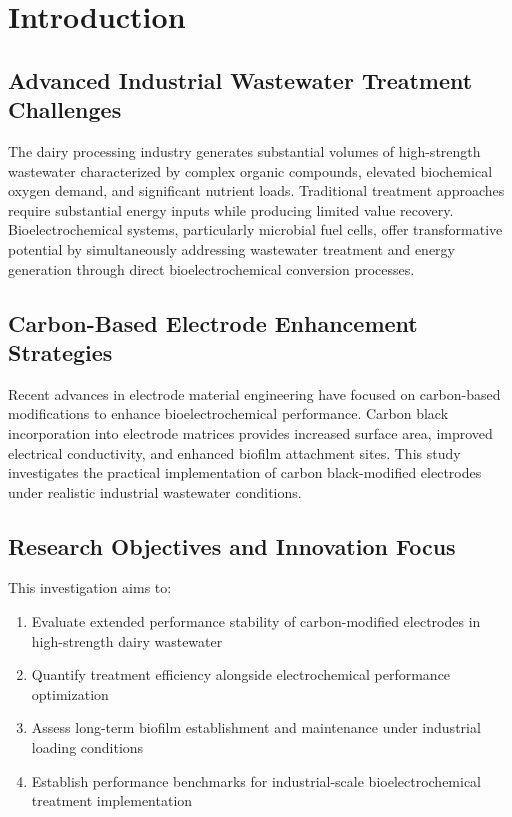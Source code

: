 \documentclass[12pt,a4paper]{article}
\begin{document}
\tableofcontents
\newpage

\section{Introduction}

\subsection{Advanced Industrial Wastewater Treatment Challenges}

The dairy processing industry generates substantial volumes of high-strength wastewater characterized by complex organic compounds, elevated biochemical oxygen demand, and significant nutrient loads. Traditional treatment approaches require substantial energy inputs while producing limited value recovery. Bioelectrochemical systems, particularly microbial fuel cells, offer transformative potential by simultaneously addressing wastewater treatment and energy generation through direct bioelectrochemical conversion processes.

\subsection{Carbon-Based Electrode Enhancement Strategies}

Recent advances in electrode material engineering have focused on carbon-based modifications to enhance bioelectrochemical performance. Carbon black incorporation into electrode matrices provides increased surface area, improved electrical conductivity, and enhanced biofilm attachment sites. This study investigates the practical implementation of carbon black-modified electrodes under realistic industrial wastewater conditions.

\subsection{Research Objectives and Innovation Focus}

This investigation aims to:
\begin{enumerate}
    \item Evaluate extended performance stability of carbon-modified electrodes in high-strength dairy wastewater
    \item Quantify treatment efficiency alongside electrochemical performance optimization
    \item Assess long-term biofilm establishment and maintenance under industrial loading conditions
    \item Establish performance benchmarks for industrial-scale bioelectrochemical treatment implementation
\end{enumerate}
\end{document}
